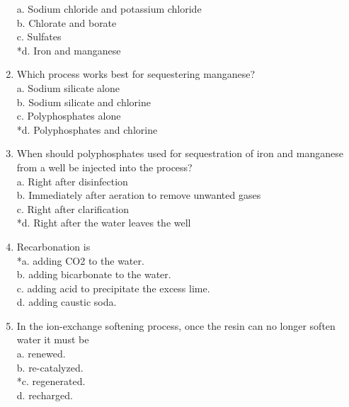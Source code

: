\begin{enumerate}[label=TG-\arabic*]
a. Sodium chloride and potassium chloride\\
b. Chlorate and borate\\
c. Sulfates\\
*d. Iron and manganese\\
\item Which process works best for sequestering manganese?\\
a. Sodium silicate alone\\
b. Sodium silicate and chlorine\\
c. Polyphosphates alone\\
*d. Polyphosphates and chlorine\\
\item When should polyphosphates used for sequestration of iron and manganese from a well be injected into the process?\\
a. Right after disinfection\\
b. Immediately after aeration to remove unwanted gases\\
c. Right after clarification\\
*d. Right after the water leaves the well\\
\item Recarbonation is\\
*a. adding CO2 to the water.\\
b. adding bicarbonate to the water.\\
c. adding acid to precipitate the excess lime.\\
d. adding caustic soda.\\
\item In the ion-exchange softening process, once the resin can no longer soften water it must be\\
a. renewed.\\
b. re-catalyzed.\\
*c. regenerated.\\
d. recharged.\\
\end{enumerate}
